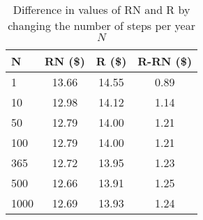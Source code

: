 \vspace*{10pt}
\begin{table}[h]
    \centering
    \begin{tabular}{|l|c|c|c|}
       
        \hline
        \textbf{N} & \textbf{RN (\$)} & \textbf{R (\$)} & \textbf{R-RN (\$)}\\
        \hline
        1 & 13.66 & 14.55 & 0.89 \\
        \hline
        10 & 12.98 & 14.12 & 1.14 \\
        \hline
        50 & 12.79 & 14.00 & 1.21 \\
        \hline
        100 & 12.79 & 14.00 & 1.21 \\
        \hline
        365 & 12.72 & 13.95 & 1.23 \\
        \hline
        500 & 12.66 & 13.91 & 1.25 \\
        \hline
        1000 & 12.69 & 13.93 & 1.24 \\
        \hline
    \end{tabular}
    \caption{Difference in values of RN and R by changing the number of steps per year $N$}
    \label{tab:diff_n}
\end{table}
